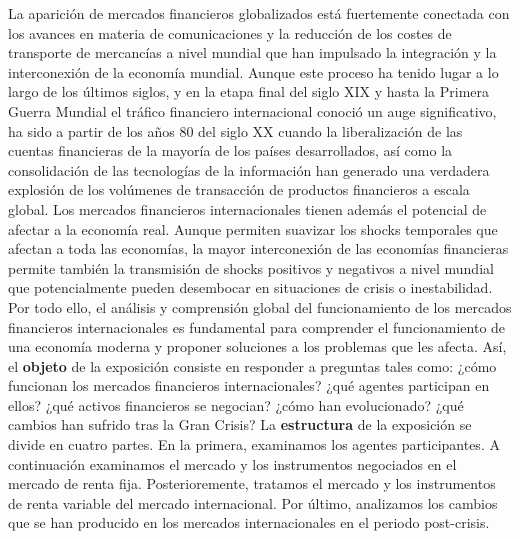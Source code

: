\documentclass{nuevotema}
\begin{document}
La aparición de mercados financieros globalizados está fuertemente conectada con los avances en materia de comunicaciones y la reducción de los costes de transporte de mercancías a nivel mundial que han impulsado la integración y la interconexión de la economía mundial. Aunque este proceso ha tenido lugar a lo largo de los últimos siglos, y en la etapa final del siglo XIX y hasta la Primera Guerra Mundial el tráfico financiero internacional conoció un auge significativo, ha sido a partir de los años 80 del siglo XX cuando la liberalización de las cuentas financieras de la mayoría de los países desarrollados, así como la consolidación de las tecnologías de la información han generado una verdadera explosión de los volúmenes de transacción de productos financieros a escala global. Los mercados financieros internacionales tienen además el potencial de afectar a la economía real. Aunque permiten suavizar los shocks temporales que afectan a toda las economías, la mayor interconexión de las economías financieras permite también la transmisión de shocks positivos y negativos a nivel mundial que potencialmente pueden desembocar en situaciones de crisis o inestabilidad. Por todo ello, el análisis y comprensión global del funcionamiento de los mercados financieros internacionales es fundamental para comprender el funcionamiento de una economía moderna y proponer soluciones a los problemas que les afecta. Así, el \textbf{objeto} de la exposición consiste en responder a preguntas tales como: ¿cómo funcionan los mercados financieros internacionales? ¿qué agentes participan en ellos? ¿qué activos financieros se negocian? ¿cómo han evolucionado? ¿qué cambios han sufrido tras la Gran Crisis? La \textbf{estructura} de la exposición se divide en cuatro partes. En la primera, examinamos los agentes participantes. A continuación examinamos el mercado y los instrumentos negociados en el mercado de renta fija. Posterioremente, tratamos el mercado y los instrumentos de renta variable del mercado internacional. Por último, analizamos los cambios que se han producido en los mercados internacionales en el periodo post-crisis.
\end{document}
